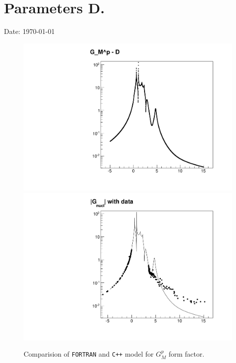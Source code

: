 \documentclass[a4paper,12pt,final]{article}
\begin{document}
\pagestyle{empty}

\section*{Parameters D.}

Date: \today

\begin{figure}[h!]
\begin{center}
\includegraphics[angle=0,scale=0.33]{GMp-ModD}
\includegraphics[angle=0,scale=0.33]{GMp-D}
\end{center}
\caption{Comparision of \texttt{FORTRAN} and \texttt{C++} model for $G_M^p$ form factor.}
\end{figure}
\end{document}
